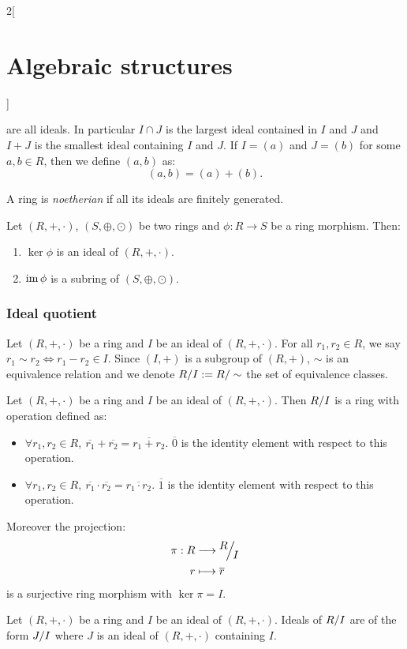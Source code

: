 \documentclass[../../../main.tex]{subfiles}
\begin{document}
\begin{multicols}{2}[\section{Algebraic structures}]
\begin{prop}
    are all ideals. In particular $I\cap J$ is the largest ideal contained in $I$ and $J$ and $I+J$ is the smallest ideal containing $I$ and $J$. If $I=(a)$ and $J=(b)$ for some $a,b\in R$, then we define $(a,b)$ as: $$(a,b)=(a)+(b).$$
\end{prop}
\begin{definition}
    A ring is \textit{noetherian} if all its ideals are finitely generated.
\end{definition}
\begin{lemma}
    Let $(R,+,\cdot)$, $(S,\oplus,\odot)$ be two rings and $\phi:R\rightarrow S$ be a ring morphism. Then:
    \begin{enumerate}
        \item $\ker\phi$ is an ideal of $(R,+,\cdot)$.
        \item $\operatorname{im}\phi$ is a subring of $(S,\oplus,\odot)$.
    \end{enumerate}
\end{lemma}
\subsubsection*{Ideal quotient}
\begin{definition}
    Let $(R,+,\cdot)$ be a ring and $I$ be an ideal of $(R,+,\cdot)$. For all $r_1,r_2\in R$, we say $r_1\sim r_2\iff r_1-r_2\in I$. Since $(I,+)$ is a subgroup of $(R,+)$, $\sim$ is an equivalence relation and we denote $\quot{R}{I}:=\quot{R}{\sim}$ the set of equivalence classes.
\end{definition}
\begin{prop}
    Let $(R,+,\cdot)$ be a ring and $I$ be an ideal of $(R,+,\cdot)$. Then $\quot{R}{I}$ is a ring with operation defined as:
    \begin{itemize}
        \item $\forall r_1,r_2\in R,\ \overline{r_1}+\overline{r_2}=\overline{r_1+r_2}$. $\overline{0}$ is the identity element with respect to this operation.
        \item $\forall r_1,r_2\in R,\ \overline{r_1}\cdot\overline{r_2}=\overline{r_1\cdot r_2}$. $\overline{1}$ is the identity element with respect to this operation.
    \end{itemize}
    Moreover the projection:
    \begin{align*}
        \pi:R&\longrightarrow\quot{R}{I}\\
        r&\longmapsto\overline{r}
    \end{align*}
    is a surjective ring morphism with $\ker\pi=I$.
\end{prop}
\begin{corollary}
    Let $(R,+,\cdot)$ be a ring and $I$ be an ideal of $(R,+,\cdot)$. Ideals of $\quot{R}{I}$ are of the form $\quot{J}{I}$ where $J$ is an ideal of $(R,+,\cdot)$ containing $I$.
\end{corollary}

\end{multicols}
\end{document}
